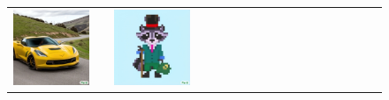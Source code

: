 \begin{figure}[ht!]
\begin{adjustwidth}{-0.8in}{-0.5in}
\begin{tabular}{cccccccccccccccccccc}
\multicolumn{2}{c}{\includegraphics[width=\threebythreecolwidth\textwidth]{figures/cherries/corvette2017.jpg}} &&
\multicolumn{2}{c}{\includegraphics[width=\threebythreecolwidth\textwidth]{figures/cherries/pixelart.jpg}} &

\end{tabular}
\end{adjustwidth}
\end{figure}
